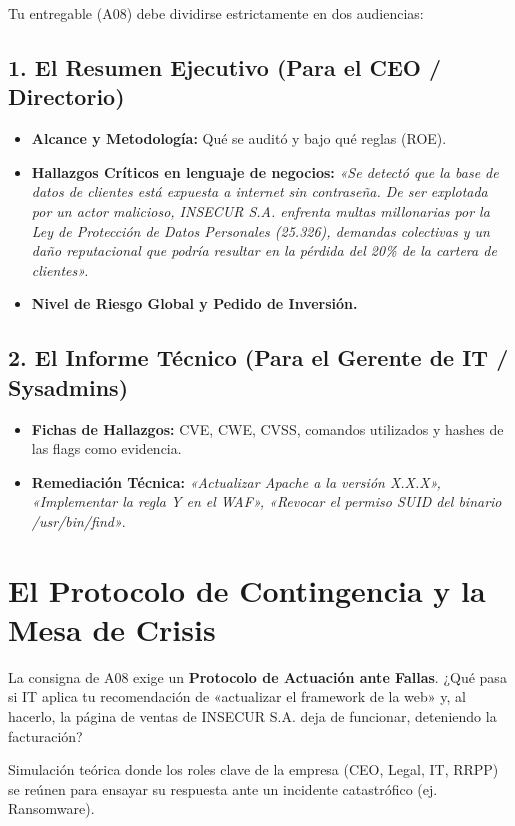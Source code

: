 \documentclass[11pt,a4paper]{article}
\begin{document}
Tu entregable (A08) debe dividirse estrictamente en dos audiencias:

\subsection{1. El Resumen Ejecutivo (Para el CEO / Directorio)}
\begin{itemize}[leftmargin=*]
  \item \textbf{Alcance y Metodología:} Qué se auditó y bajo qué reglas (ROE).
  \item \textbf{Hallazgos Críticos en lenguaje de negocios:} \textit{«Se detectó que la base de datos de clientes está expuesta a internet sin contraseña. De ser explotada por un actor malicioso, INSECUR S.A. enfrenta multas millonarias por la Ley de Protección de Datos Personales (25.326), demandas colectivas y un daño reputacional que podría resultar en la pérdida del 20\% de la cartera de clientes».}
  \item \textbf{Nivel de Riesgo Global y Pedido de Inversión.}
\end{itemize}

\subsection{2. El Informe Técnico (Para el Gerente de IT / Sysadmins)}
\begin{itemize}[leftmargin=*]
  \item \textbf{Fichas de Hallazgos:} CVE, CWE, CVSS, comandos utilizados y hashes de las flags como evidencia.
  \item \textbf{Remediación Técnica:} \textit{«Actualizar Apache a la versión X.X.X», «Implementar la regla Y en el WAF», «Revocar el permiso SUID del binario /usr/bin/find»}.
\end{itemize}

\section{El Protocolo de Contingencia y la Mesa de Crisis}
La consigna de A08 exige un \textbf{Protocolo de Actuación ante Fallas}. ¿Qué pasa si IT aplica tu recomendación de «actualizar el framework de la web» y, al hacerlo, la página de ventas de INSECUR S.A. deja de funcionar, deteniendo la facturación?

\begin{definicion}
Simulación teórica donde los roles clave de la empresa (CEO, Legal, IT, RRPP) se reúnen para ensayar su respuesta ante un incidente catastrófico (ej. Ransomware).
\end{definicion}
\end{document}
